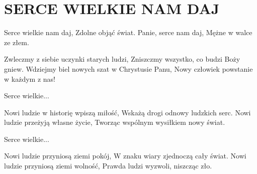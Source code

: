 \documentclass[../../../songbook.tex]{subfiles}
\begin{document}
\TabPositions{8cm} %
\section*{SERCE WIELKIE NAM DAJ}
\vspace{0.5cm}
\-\hspace{1cm} Serce wielkie nam daj,		 \newline
\-\hspace{1cm} Zdolne objąć świat.		 \newline
\-\hspace{1cm} Panie, serce nam daj,		 \newline
\-\hspace{1cm} Mężne w walce ze złem.	 \newline

Zwleczmy z siebie uczynki starych ludzi,		 \newline
Zniszczmy wszystko, co budzi Boży gniew.		 \newline
Wdziejmy biel nowych szat w Chrystusie Panu,	 \newline
Nowy człowiek powstanie w każdym z nas!			 \newline

\-\hspace{1cm} Serce wielkie...			\newline

Nowi ludzie w historię wpiszą miłość,		\newline	
Wskażą drogi odnowy ludzkich serc.			\newline
Nowi ludzie przeżyją własne życie,			\newline	
Tworząc wspólnym wysiłkiem nowy świat.		\newline

\-\hspace{1cm} Serce wielkie...			\newline

Nowi ludzie przyniosą ziemi pokój,			\newline	
W znaku wiary zjednoczą cały świat.			\newline
Nowi ludzie przyniosą ziemi wolność,		\newline	
Prawda ludzi wyzwoli, niszcząc zło.				\newline
\end{document}

